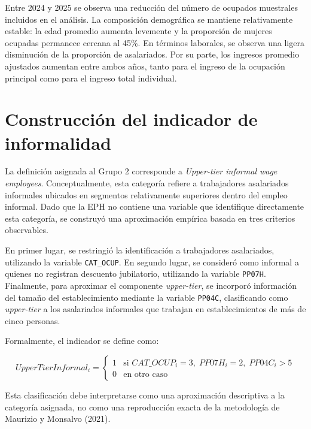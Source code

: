\documentclass[11pt,a4paper]{article}
\begin{document}
Entre 2024 y 2025 se observa una reducción del número de ocupados muestrales incluidos en el análisis. La composición demográfica se mantiene relativamente estable: la edad promedio aumenta levemente y la proporción de mujeres ocupadas permanece cercana al 45\%. En términos laborales, se observa una ligera disminución de la proporción de asalariados. Por su parte, los ingresos promedio ajustados aumentan entre ambos años, tanto para el ingreso de la ocupación principal como para el ingreso total individual.


\section{Construcción del indicador de informalidad}

La definición asignada al Grupo 2 corresponde a \textit{Upper-tier informal wage employees}. Conceptualmente, esta categoría refiere a trabajadores asalariados informales ubicados en segmentos relativamente superiores dentro del empleo informal. Dado que la EPH no contiene una variable que identifique directamente esta categoría, se construyó una aproximación empírica basada en tres criterios observables.

En primer lugar, se restringió la identificación a trabajadores asalariados, utilizando la variable \texttt{CAT\_OCUP}. En segundo lugar, se consideró como informal a quienes no registran descuento jubilatorio, utilizando la variable \texttt{PP07H}. Finalmente, para aproximar el componente \textit{upper-tier}, se incorporó información del tamaño del establecimiento mediante la variable \texttt{PP04C}, clasificando como \textit{upper-tier} a los asalariados informales que trabajan en establecimientos de más de cinco personas.

Formalmente, el indicador se define como:

\[
UpperTierInformal_i =
\begin{cases}
1 & \text{si } CAT\_OCUP_i = 3,\; PP07H_i = 2,\; PP04C_i > 5 \\
0 & \text{en otro caso}
\end{cases}
\]

Esta clasificación debe interpretarse como una aproximación descriptiva a la categoría asignada, no como una reproducción exacta de la metodología de Maurizio y Monsalvo (2021).
\end{document}
